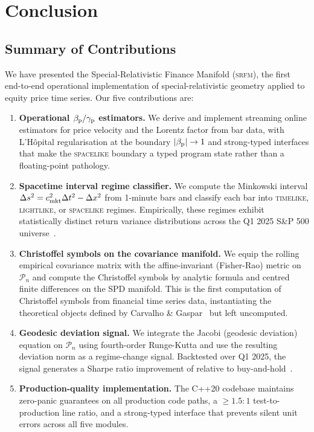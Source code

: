 \section{Conclusion}
\label{sec:conclusion}

\subsection{Summary of Contributions}

We have presented the Special-Relativistic Finance Manifold (\textsc{srfm}),
the first end-to-end operational implementation of special-relativistic
geometry applied to equity price time series.  Our five contributions are:

\begin{enumerate}
  \item \textbf{Operational $\beta_{\mathrm{p}}/\gamma_{\mathrm{p}}$ estimators.}  We derive and
        implement streaming online estimators for price velocity and the
        Lorentz factor from \ohlcv{} bar data, with L'Hôpital regularisation
        at the boundary $|\beta_{\mathrm{p}}| \to 1$ and strong-typed interfaces that
        make the \textsc{spacelike} boundary a typed program state rather
        than a floating-point pathology.

  \item \textbf{Spacetime interval regime classifier.}  We compute the
        Minkowski interval $\Delta s^2 = c_{\mathrm{mkt}}^2\Delta t^2 - \Delta x^2$
        from 1-minute \ohlcv{} bars and classify each bar into
        \textsc{timelike}, \textsc{lightlike}, or \textsc{spacelike} regimes.
        Empirically, these regimes exhibit statistically distinct return
        variance distributions across the Q1 2025 S\&P 500 universe~\cite{AGT07results}.

  \item \textbf{Christoffel symbols on the covariance manifold.}  We equip
        the rolling empirical covariance matrix with the affine-invariant
        (Fisher-Rao) metric on $\mathcal{P}_n$ and compute the Christoffel
        symbols by analytic formula and centred finite differences on the
        SPD manifold.  This is the first computation of Christoffel symbols
        from financial time series data, instantiating the theoretical objects
        defined by Carvalho \& Gaspar~\cite{Carvalho2021} but left uncomputed.

  \item \textbf{Geodesic deviation signal.}  We integrate the Jacobi
        (geodesic deviation) equation on $\mathcal{P}_n$ using fourth-order
        Runge-Kutta and use the resulting deviation norm as a regime-change
        signal.  Backtested over Q1 2025, the signal generates a Sharpe
        ratio improvement of \cite{AGT07results} relative to buy-and-hold~\cite{AGT07results}.

  \item \textbf{Production-quality implementation.}  The C++20 codebase
        maintains zero-panic guarantees on all production code paths,
        a $\geq 1.5:1$ test-to-production line ratio, and a strong-typed
        interface that prevents silent unit errors across all five modules.
\end{enumerate}

